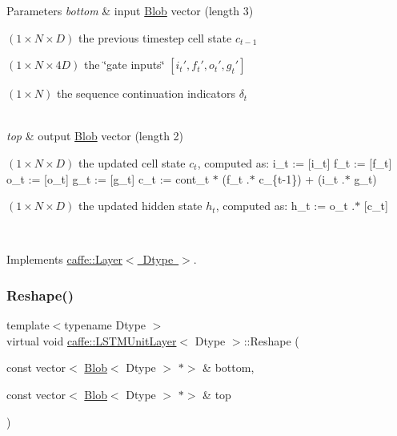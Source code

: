 \begin{DoxyParams}{Parameters}
{\em bottom} & input \mbox{\hyperlink{classcaffe_1_1_blob}{Blob}} vector (length 3)
\begin{DoxyEnumerate}
\item $ (1 \times N \times D) $ the previous timestep cell state $ c_{t-1} $
\item $ (1 \times N \times 4D) $ the \char`\"{}gate inputs\char`\"{} $ [i_t', f_t', o_t', g_t'] $
\item $ (1 \times N) $ the sequence continuation indicators $ \delta_t $ 
\end{DoxyEnumerate}\\
\hline
{\em top} & output \mbox{\hyperlink{classcaffe_1_1_blob}{Blob}} vector (length 2)
\begin{DoxyEnumerate}
\item $ (1 \times N \times D) $ the updated cell state $ c_t $, computed as\+: i\+\_\+t \+:= \mbox{[}i\+\_\+t\textquotesingle{}\mbox{]} f\+\_\+t \+:= \mbox{[}f\+\_\+t\textquotesingle{}\mbox{]} o\+\_\+t \+:= \mbox{[}o\+\_\+t\textquotesingle{}\mbox{]} g\+\_\+t \+:= \mbox{[}g\+\_\+t\textquotesingle{}\mbox{]} c\+\_\+t \+:= cont\+\_\+t $\ast$ (f\+\_\+t .$\ast$ c\+\_\+\{t-\/1\}) + (i\+\_\+t .$\ast$ g\+\_\+t)
\item $ (1 \times N \times D) $ the updated hidden state $ h_t $, computed as\+: h\+\_\+t \+:= o\+\_\+t .$\ast$ \mbox{[}c\+\_\+t\mbox{]} 
\end{DoxyEnumerate}\\
\hline
\end{DoxyParams}


Implements \mbox{\hyperlink{classcaffe_1_1_layer_a576ac6a60b1e99fe383831f52a6cea77}{caffe\+::\+Layer$<$ Dtype $>$}}.

\mbox{\label{classcaffe_1_1_l_s_t_m_unit_layer_aa6b2edc73f84705744f9f17ad2d014bb}} 
\subsubsection{\texorpdfstring{Reshape()}{Reshape()}\hspace{0.1cm}{\footnotesize\ttfamily [1/2]}}
{\footnotesize\ttfamily template$<$typename Dtype $>$ \\
virtual void \mbox{\hyperlink{classcaffe_1_1_l_s_t_m_unit_layer}{caffe\+::\+L\+S\+T\+M\+Unit\+Layer}}$<$ Dtype $>$\+::Reshape (\begin{DoxyParamCaption}\item[{const vector$<$ \mbox{\hyperlink{classcaffe_1_1_blob}{Blob}}$<$ Dtype $>$ $\ast$$>$ \&}]{bottom,  }\item[{const vector$<$ \mbox{\hyperlink{classcaffe_1_1_blob}{Blob}}$<$ Dtype $>$ $\ast$$>$ \&}]{top }\end{DoxyParamCaption})\hspace{0.3cm}{\ttfamily [virtual]}}



